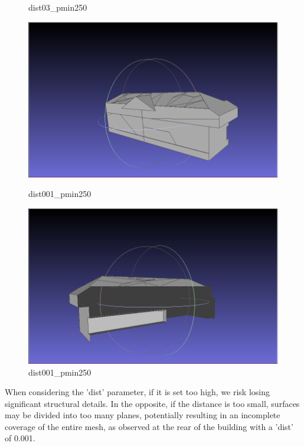 \documentclass{article}
\begin{document}
\begin{figure}[H]
\begin{minipage}[b]{0.45\textwidth}
      \caption{dist03\_pmin250}
      \label{fig:dist03_pmin250}
    \end{minipage}
    \hfill
    \begin{minipage}[b]{0.45\textwidth}

        \includegraphics[width=\textwidth]{../../images/screen_kinetic/dist_001_pmin_250.png}
        \caption{dist001\_pmin250}
        \label{fig:dist1_pmin300}
      \end{minipage}
    \begin{minipage}[b]{0.45\textwidth}

        \includegraphics[width=\textwidth]{../../images/screen_kinetic/back_dist001_pmin250.png}
        \caption{dist001\_pmin250}
        \label{fig:dist1_pmin300}
      \end{minipage}
  \end{figure}


  When considering the 'dist' parameter, if it is set too high, we risk losing significant structural details. 
  In the opposite, if the distance is too small, surfaces may be divided into too many planes, potentially resulting in an incomplete coverage of the entire mesh, 
  as observed at the rear of the building with a 'dist' of 0.001.
\end{document}
